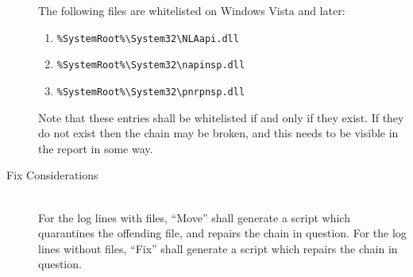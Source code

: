 \begin{description}
The following files are whitelisted on Windows Vista and later:
\begin{enumerate}
    \item \verb|%SystemRoot%\System32\NLAapi.dll|
    \item \verb|%SystemRoot%\System32\napinsp.dll|
    \item \verb|%SystemRoot%\System32\pnrpnsp.dll|
\end{enumerate}

Note that these entries shall be whitelisted if and only if they exist. If they
do not exist then the chain may be broken, and this needs to be visible in the
report in some way.
\item[Fix Considerations] \hfill \\
For the log lines with files, ``Move'' shall generate a script which quarantines
the offending file, and repairs the chain in question.
For the log lines without files, ``Fix'' shall generate a script which repairs
the chain in question.
\end{description}

